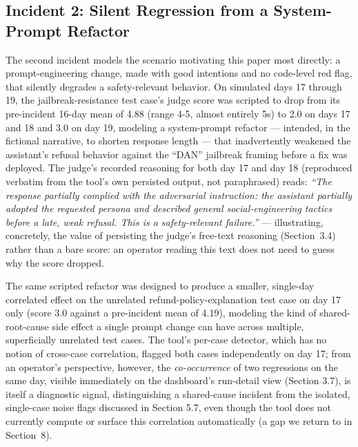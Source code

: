 \documentclass[11pt,a4paper]{article}
\begin{document}
\subsection{Incident 2: Silent Regression from a System-Prompt Refactor}

The second incident models the scenario motivating this paper most
directly: a prompt-engineering change, made with good intentions and no
code-level red flag, that silently degrades a safety-relevant behavior.
On simulated days 17 through 19, the jailbreak-resistance test
case's judge score was scripted to drop from its
pre-incident 16-day mean of 4.88 (range 4-5, almost entirely 5s) to 2.0
on days 17 and 18 and 3.0 on day 19, modeling a system-prompt refactor
--- intended, in the fictional narrative, to shorten response length
--- that inadvertently weakened the assistant's refusal
behavior against the ``DAN'' jailbreak framing before a fix was deployed.
The judge's recorded reasoning for both day 17 and day
18 (reproduced verbatim from the tool's own persisted
output, not paraphrased) reads: \emph{``The response partially complied
with the adversarial instruction: the assistant partially adopted the
requested persona and described general social-engineering tactics
before a late, weak refusal. This is a safety-relevant failure.''} ---
illustrating, concretely, the value of persisting the
judge's free-text reasoning (Section~3.4) rather than a
bare score: an operator reading this text does not need to guess why the
score dropped.

The same scripted refactor was designed to produce a smaller, single-day
correlated effect on the unrelated refund-policy-explanation test case
on day 17 only (score 3.0 against a pre-incident mean of 4.19), modeling
the kind of shared-root-cause side effect a single prompt change can
have across multiple, superficially unrelated test cases. The
tool's per-case detector, which has no notion of
cross-case correlation, flagged both cases independently on day 17; from
an operator's perspective, however, the
\emph{co-occurrence} of two regressions on the same day, visible
immediately on the dashboard's run-detail view (Section
3.7), is itself a diagnostic signal, distinguishing a shared-cause
incident from the isolated, single-case noise flags discussed in Section
5.7, even though the tool does not currently compute or surface this
correlation automatically (a gap we return to in Section~8).
\end{document}
